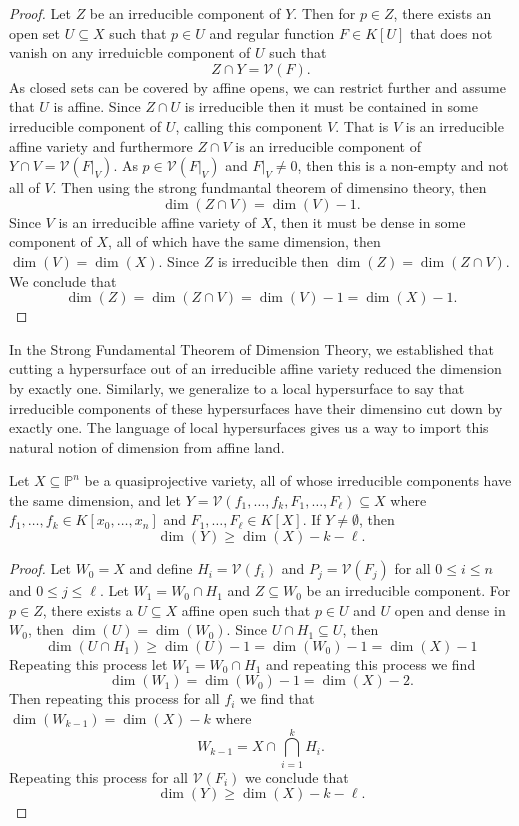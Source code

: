 \documentclass[40pt]{article}
\newcommand{\Proj}{\mathbb{P}}
\newcommand{\V}{\mathcal{V}}
\theoremstyle{remark}
\begin{document}
		\begin{proof}
			Let $Z$ be an irreducible component of $Y$. Then for $p \in Z$, there exists an open set $U \subseteq X$ such that $p \in U$ and regular function $F \in K[U]$ that does not vanish on any irreduicble component of $U$ such that 
			\[
			Z \cap Y = \V(F).
			\]
			As closed sets can be covered by affine opens, we can restrict further and assume that $U$ is affine. Since $Z \cap U$ is irreducible then it must be contained in some irreducible component of $U$, calling this component $V$. That is $V$ is an irreducible affine variety and furthermore $Z \cap V$ is an irreducible component of $Y \cap V = \V(F|_V)$. As $p \in \V(F|_V)$ and $F|_V \neq 0$, then this is a non-empty and not all of $V$. Then using the strong fundmantal theorem of dimensino theory, then
			\[
			\dim(Z \cap V) = \dim(V) -1.
			\]
			Since $V$ is an irreducible affine variety of $X$, then it must be dense in some component of $X$, all of which have the same dimension, then $\dim(V) = \dim(X)$. Since $Z$ is irreducible then $\dim(Z) = \dim(Z \cap V)$. We conclude that 
			\[
			\dim(Z) = \dim(Z\cap V) = \dim(V) - 1 = \dim(X) - 1.
			\]
			\end{proof}
		In the Strong Fundamental Theorem of Dimension Theory, we established that cutting a hypersurface out of an irreducible affine variety reduced the dimension by exactly one. Similarly, we generalize to a local hypersurface to say that irreducible components of these hypersurfaces have their dimensino cut down by exactly one. The language of local hypersurfaces gives us a way to import this natural notion of dimension from affine land. 
		\begin{prop}
			Let $X \subseteq \Proj^n$ be a quasiprojective variety, all of whose irreducible components have the same dimension, and let $Y = \V(f_1,\dots,f_k, F_1,\dots,F_\ell) \subseteq X$ where $f_1,\dots,f_k \in K[x_0,\dots,x_n]$ and $F_1,\dots,F_\ell \in K[X]$. If $Y \neq \emptyset$, then 
			\[
			\dim(Y) \geq \dim(X) - k- \ell.
			\]
		\end{prop}
		\begin{proof}
			Let $W_0 = X$ and define $H_i = \V(f_i)$ and $P_j = \V(F_j)$ for all $0 \leq i \leq n$ and $0 \leq j \leq \ell$. Let $W_1 = W_0 \cap H_1$ and $Z \subseteq W_0$ be an irreducible component. For $p \in Z$, there exists a $U \subseteq X$ affine open such that $p \in U$ and $U$ open and dense in $W_0$, then $\dim(U) = \dim(W_0)$. Since $U \cap H_1 \subseteq U$, then 
			\[
			\dim(U\cap H_1) \geq \dim(U) - 1 = \dim(W_0) - 1 = \dim(X) - 1
			\]
			Repeating this process let $W_1 = W_0 \cap H_1$ and repeating this process we find 
			\[
			\dim(W_1) = \dim(W_0) - 1 = \dim(X) - 2.
			\]
			Then repeating this process for all $f_i$ we find that $\dim(W_{k-1}) = \dim(X) - k$ where 
			\[
			W_{k-1} = X \cap \bigcap_{i=1}^k H_i.
			\]
			Repeating this process for all $\V(F_i)$ we conclude that 
			\[
			\dim(Y) \geq \dim(X) - k - \ell.
			\]
		\end{proof}
\end{document}
